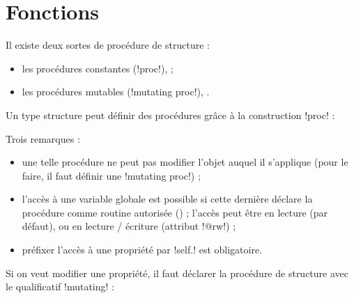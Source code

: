 \section{Fonctions}



Il existe deux sortes de procédure de structure :
\begin{itemize}
  \item les procédures constantes (\plm!proc!),  ;
  \item les procédures mutables (\plm!mutating proc!), .
\end{itemize}



Un type structure peut définir des procédures grâce à la construction \plm!proc! :


Trois remarques :
\begin{itemize}
  \item une telle procédure ne peut pas modifier l'objet auquel il s'applique (pour le faire, il faut définir une \plm!mutating proc!) ;
  \item l'accès à une variable globale est possible si cette dernière déclare la procédure comme routine autorisée () ; l'accès peut être en lecture (par défaut), ou en lecture / écriture (attribut \plm!@rw!) ;
  \item préfixer l'accès à une propriété par \plm!self.! est obligatoire. 
\end{itemize}





Si on veut modifier une propriété, il faut déclarer la procédure de structure avec le qualificatif \plm!mutating! :


